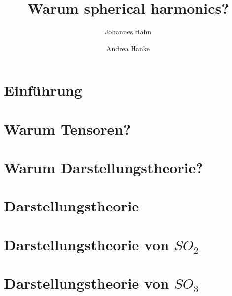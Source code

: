 \documentclass[fontsize=11pt,fleqn,a4paper]{scrartcl}
\author{Johannes Hahn \and Andrea Hanke}
\title{Warum spherical harmonics?}
\begin{document}
\maketitle

\tableofcontents

\setcounter{section}{-1}
\section{Einführung}

\section{Warum Tensoren?}



\section{Warum Darstellungstheorie?}







\section{Darstellungstheorie}
\section{Darstellungstheorie \texorpdfstring{von $SO_2$}{der zweidimensionalen Drehgruppe}}
\section{Darstellungstheorie \texorpdfstring{von $SO_3$}{der dreidimensionalen Drehgruppe}}
\end{document}
